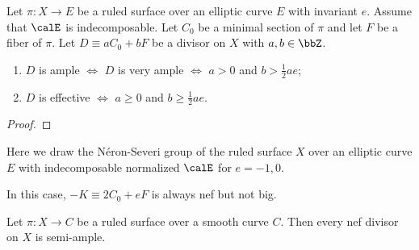     \begin{theorem}\label{thm:positivity_of_divisors_on_indecomposable_ruled_surface_over_elliptic_curve}
        Let \(\pi:X \to E\) be a ruled surface over an elliptic curve \(E\) with invariant \(e\).
        Assume that \(\calE\) is indecomposable.
        Let \(C_0\) be a minimal section of \(\pi\) and let \(F\) be a fiber of \(\pi\). 
        Let \(D \equiv aC_0 + bF\) be a divisor on \(X\) with \(a,b \in \bbZ\).
        \begin{enumerate}
            \item \(D\) is ample \(\iff\) \(D\) is very ample \(\iff\) \(a > 0\) and \(b > \frac{1}{2}ae\);
            \item \(D\) is effective \(\iff\) \(a \geq 0\) and \(b \geq \frac{1}{2}ae\).
        \end{enumerate}
    \end{theorem}
    \begin{proof}
    \end{proof}

    \begin{example}\label{eg:Neron_Severi_group_of_indecomposable_ruled_surface_over_elliptic_curve}
        Here we draw the N\'eron-Severi group of the ruled surface \(X\) over an elliptic curve \(E\) with indecomposable normalized \(\calE\) for \(e = -1,0\).
        \begin{center}
        \end{center}
        In this case, \(-K\equiv 2C_0 + eF\) is always nef but not big.
    \end{example}


    \begin{proposition}\label{prop:nef_is_bpf_on_ruled_surface}
        Let \(\pi:X \to C\) be a ruled surface over a smooth curve \(C\).
        Then every nef divisor on \(X\) is semi-ample.
    \end{proposition}

